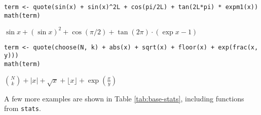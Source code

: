 \begin{verbatim}
term <- quote(sin(x) + sin(x)^2L + cos(pi/2L) + tan(2L*pi) * expm1(x))
math(term)
\end{verbatim}

\({{{\sin{x}}{+}{{\left(\sin{x}\right)}^{2}}}{+}{\cos{\left({\pi}{/}{2}\right)}}}{+}{{\tan{\left({2}{{}}{\pi}\right)}}{\cdot}{\left({\exp{x}}{-}{1}\right)}}\)

\begin{verbatim}
term <- quote(choose(N, k) + abs(x) + sqrt(x) + floor(x) + exp(frac(x, y)))
math(term)
\end{verbatim}

\({{{{\binom{N}{k}}{+}{{\left\vert{x}\right\vert}}}{+}{\sqrt{x}}}{+}{\lfloor{x}\rfloor}}{+}{\exp{\left(\frac{x}{y}\right)}}\)

A few more examples are shown in Table \ref{tab:base-stats}, including
functions from \texttt{stats}.

